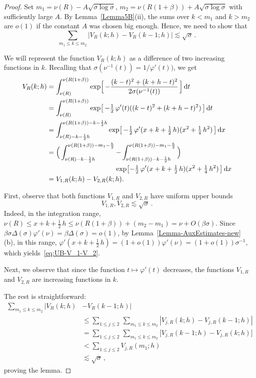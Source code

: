 \documentclass[10pt,a4paper]{amsart}
\begin{document}
\begin{proof}
Set $m_1 = \nu(R) - A\sqrt{\sigma\log\sigma}$, $m_2 = \nu(R(1+\beta)) +A\sqrt{\sigma\log\sigma}$
with sufficiently large $A$. By Lemma~\ref{Lemma5B}(ii), the sums over $k<m_1$ and
$k>m_2$
are $o(1)$ if the constant $A$ was chosen big enough. Hence, we need to show that
\[ \sum_{m_1 \le k \le m_2} |V_R(k; h) - V_R(k-1; h)| \lesssim \sqrt{\sigma}\,. \]

We will represent the function $V_R(k; h)$ as a difference of two increasing
functions in $k$. Recalling that $\sigma (\nu^{-1}(t)) = 1/\varphi'(t))$,
we get
\begin{align*}
V_R(k; h) &= \int_{\nu(R)}^{\nu(R(1+\beta))}
\exp\Bigl[\,
- \frac{(k-t)^2+(k+h-t)^2}{2\sigma(\nu^{-1}(t))}
\,\Bigr]\, {\rm d}t \\
&= \int_{\nu(R)}^{\nu(R(1+\beta))}
\exp\bigl[\,
- \tfrac12\, \varphi'(t)((k-t)^2+(k+h-t)^2)
\,\bigr]\, {\rm d}t \\
&= \int_{\nu(R)-k-\frac12 h}^{\nu(R(1+\beta))-k-\frac12 h}
\exp\bigl[\,
- \tfrac12\, \varphi'(x+k+\tfrac12\, h)(x^2 + \tfrac14\, h^2)
\,\bigr]\, {\rm d}x \\
&= \Bigl(\, \int_{\nu(R)-k-\frac12 h}^{\nu(R(1+\beta))-m_1 -\frac{h}2}
- \int_{\nu(R(1+\beta))-k-\frac12 h}^{\nu(R(1+\beta))-m_1 -\frac{h}2} \,\Bigr)\\
&\qquad\qquad\qquad\qquad\qquad\exp\bigl[
- \tfrac12\, \varphi'(x+k+\tfrac12\, h)(x^2 + \tfrac14\, h^2)
\,\bigr]\, {\rm d}x \\
&= V_{1, R}(k; h) - V_{2, R}(k; h).
\end{align*}

First, observe that both functions $V_{1, R}$ and $V_{2, R}$ have uniform upper bounds
\begin{equation}\label{eq:UB-V_1-V_2}
V_{1, R}, V_{2, R} \lesssim \sqrt{\sigma}\,.
\end{equation}
Indeed, in the integration range, $\nu(R) \le x+k+\tfrac12\, h \le \nu(R(1+\beta)) + (m_2-m_1)
= \nu + O(\beta\sigma)$. Since $\beta\sigma\Delta(\sigma) \varphi'(\nu) =
\beta \Delta(\sigma) = o(1)$, by Lemma~\ref{Lemma-AuxEstimates-new}(b), in this range,
$\varphi'(x+k+\tfrac12\, h) = (1+o(1))\varphi'(\nu) = (1+o(1))\sigma^{-1}$,
which yields~\eqref{eq:UB-V_1-V_2}.

Next, we observe that since the function $t\mapsto \varphi'(t)$ decreases,
the functions $V_{1, R}$ and $V_{2, R}$ are increasing functions in $k$.

The rest is straightforward:
\begin{align*}
 \sum_{m_1 \le k \le m_2}
|V_R(k; h) &- V_R(k-1; h)| \\
& 
\le
\sum_{1\le j\le 2}\,\sum_{m_1 \le k \le m_2}
|V_{j, R}(k; h) - V_{j, R}(k-1; h)|
\\
& 
= \sum_{1\le j\le 2}\,\sum_{m_1 \le k \le m_2}
\bigl[ V_{j, R}(k-1; h) - V_{j, R}(k; h) \bigr]
\\
&   < \sum_{1\le j\le 2}V_{j, R}(m_1; h) 
\\
&  \lesssim \sqrt{\sigma}\,,
\end{align*}
proving the lemma.
\end{proof}
\end{document}
